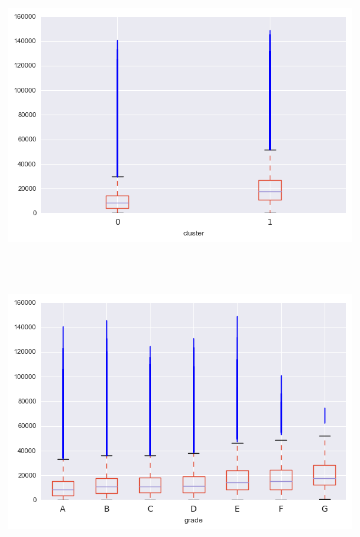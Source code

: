 \begin{apendicesenv}
\begin{figure}[t!]
\begin{subfigure}[t]{0.5\textwidth}
			\centerline{\includegraphics[width=1\textwidth]{img/revol_bal_by_cluster}}
    	\end{subfigure}%
    	~ 
    	\begin{subfigure}[t]{0.5\textwidth}
    		\centering
   
			\centerline{\includegraphics[width=1\textwidth]{img/revol_bal_by_grade}}

    	\end{subfigure}
    	\\
    	        \caption{total\textunderscore acc}
    	\begin{subfigure}[t]{0.5\textwidth}
    		\centering


\end{subfigure}
\end{figure}
\end{apendicesenv}
